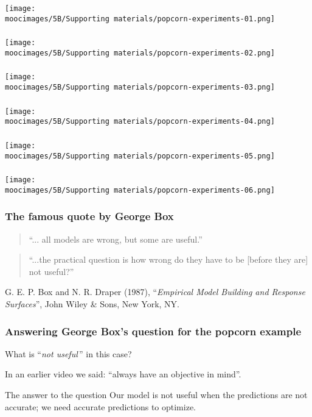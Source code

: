 \documentclass[handout,11pt,aspectratio=169,mathserif]{beamer}
\begin{document}
\begin{frame}\frametitle{}
	\centerline{\texttt{[image: \\moocimages/5B/Supporting materials/popcorn-experiments-01.png]}}
\end{frame}
\begin{frame}\frametitle{}
	\centerline{\texttt{[image: \\moocimages/5B/Supporting materials/popcorn-experiments-02.png]}}
\end{frame}
\begin{frame}\frametitle{}
	\centerline{\texttt{[image: \\moocimages/5B/Supporting materials/popcorn-experiments-03.png]}}
\end{frame}
\begin{frame}\frametitle{}
	\centerline{\texttt{[image: \\moocimages/5B/Supporting materials/popcorn-experiments-04.png]}}
\end{frame}
\begin{frame}\frametitle{}
	\centerline{\texttt{[image: \\moocimages/5B/Supporting materials/popcorn-experiments-05.png]}}
\end{frame}
\begin{frame}\frametitle{}
	\centerline{\texttt{[image: \\moocimages/5B/Supporting materials/popcorn-experiments-06.png]}}
\end{frame}
\begin{frame}\frametitle{The famous quote by George Box}
	\begin{quote}
		``... all models are wrong, but some are useful.''
	\end{quote}
	
	\begin{quote}
		``...the practical question is how wrong do they have to be [before they are] not useful?''
	\end{quote}
	
	\vspace{1cm}
	G. E. P. Box and  N. R. Draper (1987), ``\emph{Empirical Model Building and Response Surfaces}'', John Wiley \& Sons, New York, NY.
\end{frame}
\begin{frame}\frametitle{Answering George Box's question for the popcorn example}
	
	What is ``\emph{not useful}\,'' in this case?
	
	\vspace{1cm}
	In an earlier video we said: ``always have an objective in mind''.
	
	\vspace{1cm}
	\begin{exampleblock}{The answer to the question}
		Our model is not useful when the predictions are not accurate; we need accurate predictions to optimize.
	\end{exampleblock}
\end{frame}
\end{document}
